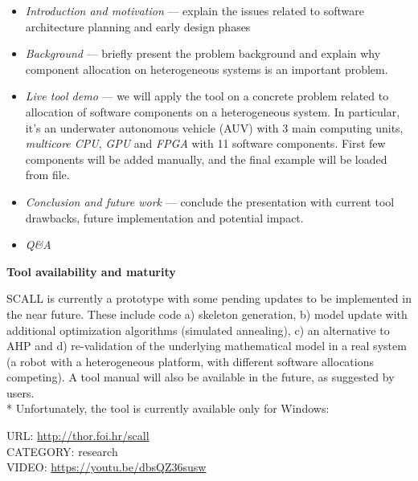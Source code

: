 \documentclass{sig-alternate}
\begin{document}
\begin{itemize}
	\item \textit{Introduction and motivation }--- explain the issues related to software architecture planning and early design phases
	
	\item \textit{Background} --- briefly present the problem background and explain why component allocation on heterogeneous systems is an important problem.
	
	\item \textit{Live tool demo} --- we will apply the tool on a concrete problem related to allocation of software components on a heterogeneous system. In particular, it's an underwater autonomous vehicle (AUV) with 3 main computing units, \textsl{multicore CPU}, \textsl{GPU} and \textsl{FPGA} with 11 software components. First few components will be added manually, and the final example will be loaded from file.
	
	\item \textit{Conclusion and future work} --- conclude the presentation with current tool drawbacks, future implementation and potential impact.
	\item \textit{Q\&A}
\end{itemize}

\textbf{Tool availability and maturity}

SCALL is currently a prototype with some pending updates to be implemented in the near future. These include code a) skeleton generation, b) model update with additional optimization algorithms (simulated annealing), c) an alternative to AHP and d) re-validation of the underlying mathematical model in a real system (a robot with a heterogeneous platform, with different software allocations competing). A tool manual will also be available in the future, as suggested by users. 
\\*
Unfortunately, the tool is currently available only for Windows:

URL: \url{http://thor.foi.hr/scall} \\

CATEGORY: research \\

VIDEO: \url{https://youtu.be/dbsQZ36susw}\\
\end{document}

